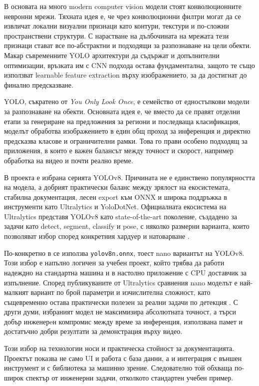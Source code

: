В основата на много modern computer vision модели стоят конволюционните невронни мрежи. Тяхната идея е, че чрез конволюционни филтри могат да се извличат локални визуални признаци като контури, текстури и по-сложни пространствени структури. С нарастване на дълбочината на мрежата тези признаци стават все по-абстрактни и подходящи за разпознаване на цели обекти. Макар съвременните YOLO архитектури да съдържат и допълнителни оптимизации, връзката им с CNN подхода остава фундаментална, защото те също използват learnable feature extraction върху изображението, за да достигнат до финално предсказване.


YOLO, съкратено от \textit{You Only Look Once}, е семейство от едностъпкови модели за разпознаване на обекти. Основната идея е, че вместо да се правят отделни етапи за генериране на предложения за региони и последваща класификация, моделът обработва изображението в един общ проход за инференция и директно предсказва класове и ограничителни рамки. Това го прави особено подходящ за приложения, в които е важен балансът между точност и скорост, например обработка на видео и почти реално време.


В проекта е избрана серията YOLOv8. Причината не е единствено популярността на модела, а добрият практически баланс между зрялост на екосистемата, стабилна документация, лесен export към ONNX и широка поддръжка в инструменти като Ultralytics и YoloDotNet. Официалната екосистема на Ultralytics представя YOLOv8 като state-of-the-art поколение, създадено за задачи като detect, segment, classify и pose, с няколко размерни варианта, които позволяват избор според конкретния хардуер и натоварване \cite{ultralyticsyolov8, ultralyticsmodels}.

По-конкретно в \projectname{} се използва \texttt{yolov8n.onnx}, тоест nano вариантът на YOLOv8. Този избор е напълно логичен за учебен проект, който трябва да работи надеждно на стандартна машина и в настолно приложение с CPU доставчик за изпълнение. Според публикуваните от Ultralytics сравнения nano моделът е най-малкият вариант по брой параметри и изчислителна сложност, като същевременно остава практически полезен за реални задачи по детекция \cite{ultralyticsmodels}. С други думи, избраният модел не максимизира абсолютната точност, а търси добър инженерeн компромис между време за инференция, използвана памет и достатъчно добри резултати за демонстрация върху видео.

Този избор на технологии носи и практическа стойност за документацията. Проектът показва не само UI и работа с база данни, а и интеграция с външен инструмент и с библиотека за машинно зрение. Следователно той обхваща по-широк спектър от инженерни задачи, отколкото стандартен учебен пример.
